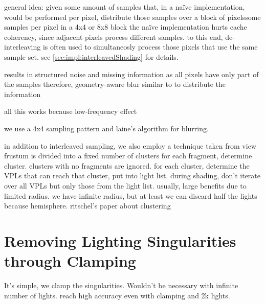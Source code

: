 \begin{outline}
\1 general idea: given some amount of samples that, in a naïve implementation, would be performed per pixel, distribute those samples over a block of pixelssome samples per pixel in a 4x4 or 8x8 block
\1 the naïve implementation hurts cache coherency, since adjacent pixels process different samples.
\1 to this end, de-interleaving is often used to simultaneosly process those pixels that use the same sample set. see \ref{sec:impl:interleavedShading} for details.

\1 results in structured noise and missing information as all pixels have only part of the samples
\1 therefore, geometry-aware blur similar to \citet{laine2007incremental} to distribute the information

\1 all this works because low-frequency effect

\1 we use a 4x4 sampling pattern and laine's algorithm for blurring.


\1 in addition to interleaved sampling, we also employ a technique taken from \citet{olsson2012clustered}
\1 view frustum is divided into a fixed number of clusters
\1 for each fragment, determine cluster. clusters with no fragments are ignored.
\1 for each cluster, determine the VPLs that can reach that cluster, put into light list.
\1 during shading, don't iterate over all VPLs but only those from the light list.
\1 usually, large benefits due to limited radius. we have infinite radius, but at least we can discard half the lights because hemisphere.
\1 ritschel's paper about clustering

\end{outline}

\section{Removing Lighting Singularities through Clamping}
\label{sec:clamping}
It's simple, we clamp the singularities. Wouldn't be necessary with infinite number of lights. \citet{hedman2016sequential} reach high accuracy even with clamping and 2k lights.
